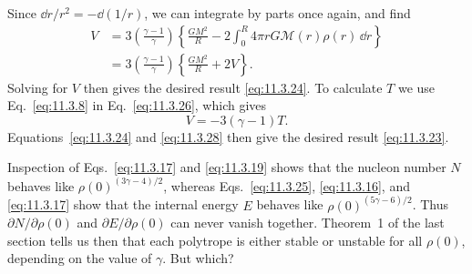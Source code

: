 Since \(\dd r/r^2=-\dd(1/r)\), we can integrate by parts once again, and find
\[
  \begin{aligned}
  V
  &=
  3\left(\frac{\gamma-1}{\gamma}\right)
  \left\{
    \frac{GM^2}{R}
    -2\int_0^R4\pi rG\mathcal{M}(r)\rho(r)\,\dd r
  \right\}\\
  &=
  3\left(\frac{\gamma-1}{\gamma}\right)
  \left\{\frac{GM^2}{R}+2V\right\}.
  \end{aligned}
\]
Solving for \(V\) then gives the desired result \eqref{eq:11.3.24}. To
calculate \(T\) we use Eq.~\eqref{eq:11.3.8} in
Eq.~\eqref{eq:11.3.26}, which gives
\begin{equation}
  V=-3(\gamma-1)T.
  \tag{11.3.28}\label{eq:11.3.28}
\end{equation}
Equations~\eqref{eq:11.3.24} and \eqref{eq:11.3.28} then give the desired
result \eqref{eq:11.3.23}.

Inspection of Eqs.~\eqref{eq:11.3.17} and \eqref{eq:11.3.19} shows that the
nucleon number \(N\) behaves like \(\rho(0)^{(3\gamma-4)/2}\), whereas
Eqs.~\eqref{eq:11.3.25}, \eqref{eq:11.3.16}, and \eqref{eq:11.3.17} show
that the internal energy \(E\) behaves like \(\rho(0)^{(5\gamma-6)/2}\).
Thus \(\partial N/\partial\rho(0)\) and \(\partial E/\partial\rho(0)\) can
never vanish together. Theorem~1 of the last section tells us then that each
polytrope is either stable or unstable for all \(\rho(0)\), depending on the
value of \(\gamma\). But which?

